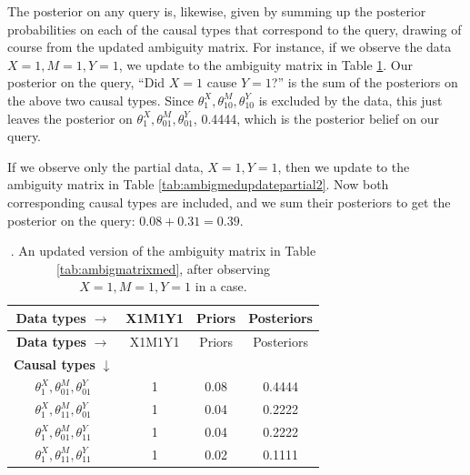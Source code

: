 \documentclass[
  12pt,
]{book}
\begin{document}
The posterior on any query is, likewise, given by summing up the posterior probabilities on each of the causal types that correspond to the query, drawing of course from the updated ambiguity matrix. For instance, if we observe the data \(X=1, M=1, Y=1\), we update to the ambiguity matrix in Table \ref{tab:ambigmedupdate2}. Our posterior on the query, ``Did \(X=1\) cause \(Y=1\)?'' is the sum of the posteriors on the above two causal types. Since \(\theta^X_1, \theta^M_{10}, \theta^Y_{10}\) is excluded by the data, this just leaves the posterior on \(\theta^X_1, \theta^M_{01}, \theta^Y_{01}\), 0.4444, which is the posterior belief on our query.

If we observe only the partial data, \(X=1, Y=1\), then we update to the ambiguity matrix in Table \ref{tab:ambigmedupdatepartial2}. Now both corresponding causal types are included, and we sum their posteriors to get the posterior on the query: \(0.08 + 0.31 = 0.39\).

\begin{longtable}[]{@{}cccc@{}}
\caption{\label{tab:ambigmedupdate2}. An updated version of the ambiguity matrix in Table \ref{tab:ambigmatrixmed}, after observing \(X=1, M=1, Y=1\) in a case.}\tabularnewline
\toprule
\textbf{Data types} \(\rightarrow\) & X1M1Y1 & Priors & Posteriors \\
\midrule
\endfirsthead
\toprule
\textbf{Data types} \(\rightarrow\) & X1M1Y1 & Priors & Posteriors \\
\midrule
\endhead
\textbf{Causal types} \(\downarrow\) & & & \\
\(\theta^X_1,\theta^M_{01},\theta^Y_{01}\) & 1 & 0.08 & 0.4444 \\
\(\theta^X_1,\theta^M_{11},\theta^Y_{01}\) & 1 & 0.04 & 0.2222 \\
\(\theta^X_1,\theta^M_{01},\theta^Y_{11}\) & 1 & 0.04 & 0.2222 \\
\(\theta^X_1,\theta^M_{11},\theta^Y_{11}\) & 1 & 0.02 & 0.1111 \\
\bottomrule
\end{longtable}
\end{document}
